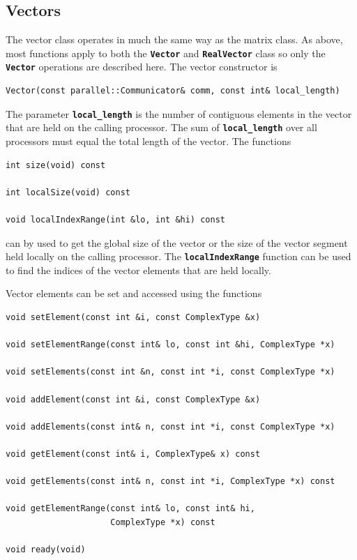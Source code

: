 \documentclass[12pt]{report} %
\begin{document}
\subsection{Vectors}

The vector class operates in much the same way as the matrix class. As above, most functions apply to both the \texttt{\textbf{Vector}} and \texttt{\textbf{RealVector}} class so only the \texttt{\textbf{Vector}} operations are described here. The vector constructor is

{
\color{red}
\begin{Verbatim}[fontseries=b]
Vector(const parallel::Communicator& comm, const int& local_length)
\end{Verbatim}
}

The parameter \texttt{\textbf{local\_length}} is the number of contiguous elements in the vector that are held on the calling processor. The sum of \texttt{\textbf{local\_length}} over all processors must equal the total length of the vector. The functions

{
\color{red}
\begin{Verbatim}[fontseries=b]
int size(void) const

int localSize(void) const

void localIndexRange(int &lo, int &hi) const
\end{Verbatim}
}

can by used to get the global size of the vector or the size of the vector segment held locally on the calling processor. The \texttt{\textbf{localIndexRange}} function can be used to find the indices of the vector elements that are held locally.

Vector elements can be set and accessed using the functions

{
\color{red}
\begin{Verbatim}[fontseries=b]
void setElement(const int &i, const ComplexType &x)

void setElementRange(const int& lo, const int &hi, ComplexType *x)

void setElements(const int &n, const int *i, const ComplexType *x)

void addElement(const int &i, const ComplexType &x)

void addElements(const int& n, const int *i, const ComplexType *x)

void getElement(const int& i, ComplexType& x) const

void getElements(const int& n, const int *i, ComplexType *x) const

void getElementRange(const int& lo, const int& hi,
                     ComplexType *x) const

void ready(void)
\end{Verbatim}
}
\end{document}
